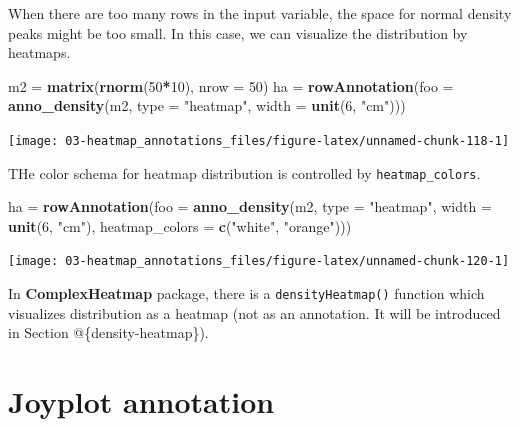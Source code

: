 \documentclass[]{book}
\newenvironment{Shaded}{\begin{snugshade}}{\end{snugshade}}
\newcommand{\KeywordTok}[1]{\textcolor[rgb]{0.13,0.29,0.53}{\textbf{#1}}}
\newcommand{\DataTypeTok}[1]{\textcolor[rgb]{0.13,0.29,0.53}{#1}}
\newcommand{\DecValTok}[1]{\textcolor[rgb]{0.00,0.00,0.81}{#1}}
\newcommand{\StringTok}[1]{\textcolor[rgb]{0.31,0.60,0.02}{#1}}
\newcommand{\OperatorTok}[1]{\textcolor[rgb]{0.81,0.36,0.00}{\textbf{#1}}}
\newcommand{\NormalTok}[1]{#1}
\theoremstyle{definition}
\theoremstyle{definition}
\theoremstyle{definition}
\theoremstyle{remark}
\begin{document}
When there are too many rows in the input variable, the space for normal
density peaks might be too small. In this case, we can visualize the
distribution by heatmaps.

\begin{Shaded}
\begin{Highlighting}[]
\NormalTok{m2 =}\StringTok{ }\KeywordTok{matrix}\NormalTok{(}\KeywordTok{rnorm}\NormalTok{(}\DecValTok{50}\OperatorTok{*}\DecValTok{10}\NormalTok{), }\DataTypeTok{nrow =} \DecValTok{50}\NormalTok{)}
\NormalTok{ha =}\StringTok{ }\KeywordTok{rowAnnotation}\NormalTok{(}\DataTypeTok{foo =} \KeywordTok{anno_density}\NormalTok{(m2, }\DataTypeTok{type =} \StringTok{"heatmap"}\NormalTok{, }\DataTypeTok{width =} \KeywordTok{unit}\NormalTok{(}\DecValTok{6}\NormalTok{, }\StringTok{"cm"}\NormalTok{)))}
\end{Highlighting}
\end{Shaded}

\begin{center}\texttt{[image: 03-heatmap\_annotations\_files/figure-latex/unnamed-chunk-118-1]} \end{center}

THe color schema for heatmap distribution is controlled by
\texttt{heatmap\_colors}.

\begin{Shaded}
\begin{Highlighting}[]
\NormalTok{ha =}\StringTok{ }\KeywordTok{rowAnnotation}\NormalTok{(}\DataTypeTok{foo =} \KeywordTok{anno_density}\NormalTok{(m2, }\DataTypeTok{type =} \StringTok{"heatmap"}\NormalTok{, }\DataTypeTok{width =} \KeywordTok{unit}\NormalTok{(}\DecValTok{6}\NormalTok{, }\StringTok{"cm"}\NormalTok{), }
    \DataTypeTok{heatmap_colors =} \KeywordTok{c}\NormalTok{(}\StringTok{"white"}\NormalTok{, }\StringTok{"orange"}\NormalTok{)))}
\end{Highlighting}
\end{Shaded}

\begin{center}\texttt{[image: 03-heatmap\_annotations\_files/figure-latex/unnamed-chunk-120-1]} \end{center}

In \textbf{ComplexHeatmap} package, there is a \texttt{densityHeatmap()}
function which visualizes distribution as a heatmap (not as an
annotation. It will be introduced in Section @\{density-heatmap\}).

\section{Joyplot annotation}\label{joyplot-annotation}
\end{document}

